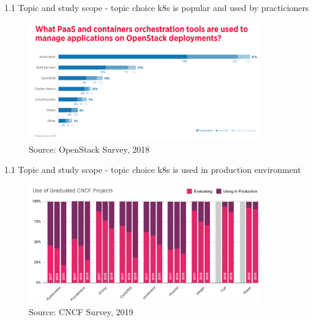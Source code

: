 \documentclass{beamer}
\begin{document}
\begin{frame}{1.1 Topic and study scope - topic choice}%
k8s is popular and used by practicioners
\begin{figure}
	\includegraphics[width=10cm]{figures/k8s-openstack-survey.png}
	\label{fig:k8s-openstack-survey}
	\\
	\tiny{Source: OpenStack Survey, 2018}
\end{figure}
\end{frame}
	
\begin{frame}{1.1 Topic and study scope - topic choice}%
k8s is used in production environment
\begin{figure}
	\includegraphics[width=10cm]{figures/cncf-k8s-used-in-production.png}
	\label{fig:cncf-k8s-used-in-production}
	\\
	\tiny{Source: CNCF Survey, 2019}
\end{figure}
\end{frame}
	
\end{document}
